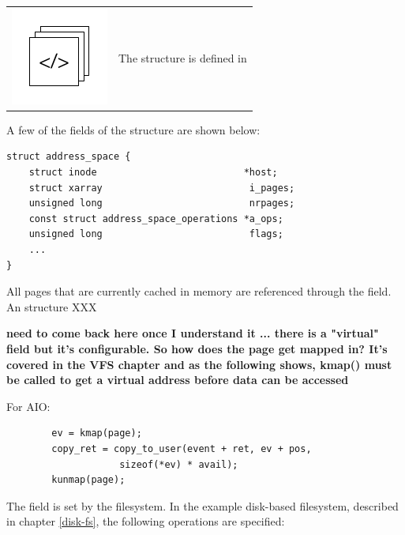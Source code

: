 \begin{table}[h]
\begin{tabular}{ll}
\parbox[l]{0.6in}{\includegraphics[scale=0.8]{figures/src-xref.pdf}} & \parbox[l]{4in}{\small{The  structure is defined in }}
\end{tabular}
\end{table}

\noindent
A few of the fields of the  structure are shown below:

\begin{lstlisting}
struct address_space {
    struct inode                          *host;
    struct xarray                          i_pages;
    unsigned long                          nrpages;
    const struct address_space_operations *a_ops;
    unsigned long                          flags;
    ...
}
\end{lstlisting}

\noindent
All pages that are currently cached in memory are referenced through the  field. An  structure XXX



\textbf{need to come back here once I understand it ... there is a "virtual" field but it's configurable. So how does the page get mapped in? It's covered in the VFS chapter and as the following shows, kmap() must be called to get a virtual address before data can be accessed}

For AIO:

\begin{lstlisting}
        ev = kmap(page);
        copy_ret = copy_to_user(event + ret, ev + pos,
                    sizeof(*ev) * avail);
        kunmap(page);
\end{lstlisting}


The  field is set by the filesystem. In the example disk-based filesystem, described in chapter \ref{disk-fs}, the following operations are specified:

